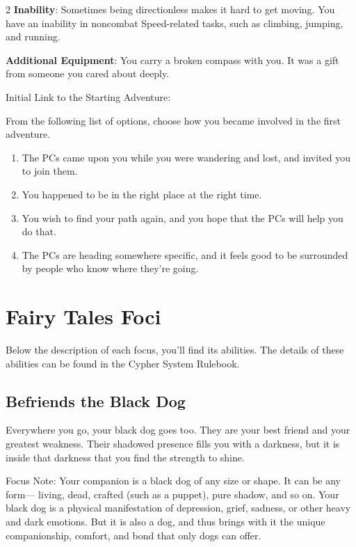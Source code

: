 \begin{multicols}{2}
\textbf{Inability}: Sometimes being directionless makes it hard to get moving. You have an inability in noncombat Speed-related tasks, such as climbing, jumping, and running.

\textbf{Additional Equipment}: You carry a broken compass with you. It was a gift from someone you cared about deeply.

Initial Link to the Starting Adventure:

From the following list of options, choose how you became involved in the first adventure.
\begin{enumerate}
\item The PCs came upon you while you were wandering and lost, and invited you to join them.
\item You happened to be in the right place at the right time.
\item You wish to find your path again, and you hope that the PCs will help you do that.
\item The PCs are heading somewhere specific, and it feels good to be surrounded by people who know where they’re going. 
\end{enumerate}

\section{Fairy Tales Foci}

Below the description of each focus, you’ll find its abilities. The details of these abilities can be found in the Cypher System Rulebook.

\subsection{Befriends the Black Dog}

Everywhere you go, your black dog goes too. They are your best friend and your greatest weakness. Their shadowed presence fills you with a darkness, but it is inside that darkness that you find the strength to shine.

Focus Note: Your companion is a black dog of any size or shape. It can be any form— living, dead, crafted (such as a puppet), pure shadow, and so on. Your black dog is a physical manifestation of depression, grief, sadness, or other heavy and dark emotions. But it is also a dog, and thus brings with it the unique companionship, comfort, and bond that only dogs can offer.


\end{multicols}
